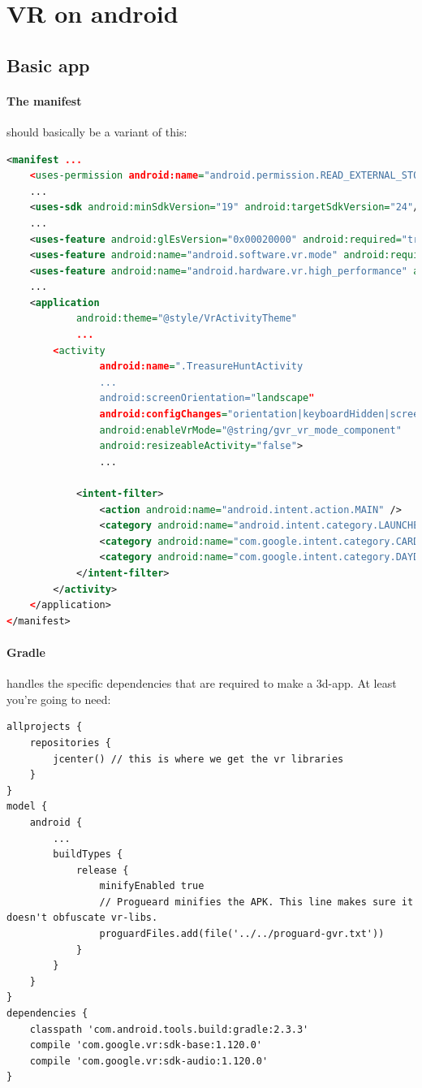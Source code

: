 \section{VR on android}

\subsection{Basic app} 

\paragraph{The manifest} should basically be a variant of this: 
\begin{lstlisting}[language=xml]
<manifest ...
    <uses-permission android:name="android.permission.READ_EXTERNAL_STORAGE" />
    ...
    <uses-sdk android:minSdkVersion="19" android:targetSdkVersion="24"/>
    ...
    <uses-feature android:glEsVersion="0x00020000" android:required="true" />
    <uses-feature android:name="android.software.vr.mode" android:required="false"/>
    <uses-feature android:name="android.hardware.vr.high_performance" android:required="false"/>
    ...
    <application
            android:theme="@style/VrActivityTheme"
            ...
        <activity
                android:name=".TreasureHuntActivity
                ...
                android:screenOrientation="landscape"
                android:configChanges="orientation|keyboardHidden|screenSize|uiMode|navigation"
                android:enableVrMode="@string/gvr_vr_mode_component"
                android:resizeableActivity="false">
                ...

            <intent-filter>
                <action android:name="android.intent.action.MAIN" />
                <category android:name="android.intent.category.LAUNCHER" />
                <category android:name="com.google.intent.category.CARDBOARD" />
                <category android:name="com.google.intent.category.DAYDREAM" />
            </intent-filter>
        </activity>
    </application>
</manifest>
\end{lstlisting}

\paragraph{Gradle} handles the specific dependencies that are required to make a 3d-app. At least you're going to need: 
\begin{lstlisting}
allprojects {
    repositories {
        jcenter() // this is where we get the vr libraries
    }
}
model {
    android {
        ...
        buildTypes {
            release {
                minifyEnabled true
                // Progueard minifies the APK. This line makes sure it doesn't obfuscate vr-libs.
                proguardFiles.add(file('../../proguard-gvr.txt'))
            }
        }
    }
}
dependencies {
    classpath 'com.android.tools.build:gradle:2.3.3'
    compile 'com.google.vr:sdk-base:1.120.0'
    compile 'com.google.vr:sdk-audio:1.120.0'
}
\end{lstlisting}

